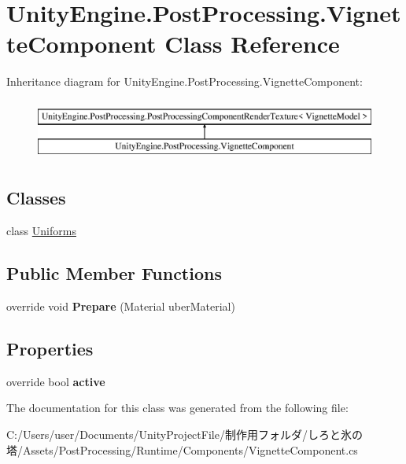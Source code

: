 \hypertarget{class_unity_engine_1_1_post_processing_1_1_vignette_component}{}\section{Unity\+Engine.\+Post\+Processing.\+Vignette\+Component Class Reference}
\label{class_unity_engine_1_1_post_processing_1_1_vignette_component}
Inheritance diagram for Unity\+Engine.\+Post\+Processing.\+Vignette\+Component\+:\begin{figure}[H]
\begin{center}
\leavevmode
\includegraphics[height=2.000000cm]{class_unity_engine_1_1_post_processing_1_1_vignette_component}
\end{center}
\end{figure}
\subsection*{Classes}
\begin{DoxyCompactItemize}
\item 
class \hyperlink{class_unity_engine_1_1_post_processing_1_1_vignette_component_1_1_uniforms}{Uniforms}
\end{DoxyCompactItemize}
\subsection*{Public Member Functions}
\begin{DoxyCompactItemize}
\item 
\mbox{\label{class_unity_engine_1_1_post_processing_1_1_vignette_component_a7f8b6fca0970717decfc4148d42c43be}} 
override void {\bfseries Prepare} (Material uber\+Material)
\end{DoxyCompactItemize}
\subsection*{Properties}
\begin{DoxyCompactItemize}
\item 
\mbox{\label{class_unity_engine_1_1_post_processing_1_1_vignette_component_a74f4203a32fb845ba8aec4d7b204c80f}} 
override bool {\bfseries active}
\end{DoxyCompactItemize}


The documentation for this class was generated from the following file\+:\begin{DoxyCompactItemize}
\item 
C\+:/\+Users/user/\+Documents/\+Unity\+Project\+File/制作用フォルダ/しろと氷の塔/\+Assets/\+Post\+Processing/\+Runtime/\+Components/Vignette\+Component.\+cs\end{DoxyCompactItemize}
